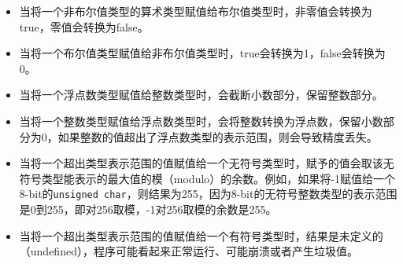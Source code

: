 \begin{itemize}
    \item 当将一个非布尔值类型的算术类型赋值给布尔值类型时，非零值会转换为true，零值会转换为false。
    \item 当将一个布尔值类型赋值给非布尔值类型时，true会转换为1，false会转换为0。
    \item 当将一个浮点数类型赋值给整数类型时，会截断小数部分，保留整数部分。
    \item 当将一个整数类型赋值给浮点数类型时，会将整数转换为浮点数，保留小数部分为0，如果整数的值超出了浮点数类型的表示范围，则会导致精度丢失。
    \item 当将一个超出类型表示范围的值赋值给一个无符号类型时，赋予的值会取该无符号类型能表示的最大值的模（modulo）的余数。例如，如果将-1赋值给一个8-bit的\texttt{unsigned char}，则结果为255，因为8-bit的无符号整数类型的表示范围是0到255，即对256取模，-1对256取模的余数是255。
    \item 当将一个超出类型表示范围的值赋值给一个有符号类型时，结果是未定义的（undefined），程序可能看起来正常运行、可能崩溃或者产生垃圾值。
\end{itemize}
